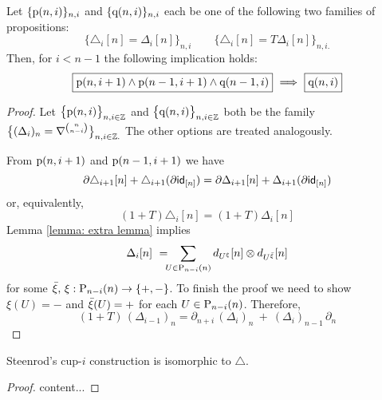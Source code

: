 \newpage


%
%
%
%
%

\begin{lemma}
    Let $\{\p(n, i)\}_{n, i}$ and $\{\q(n, i)\}_{n, i}$ each be one of the following two families of propositions:
    \[ \label{proposition: uniqueness: eq1}
    \big\{ \triangle_i  [n] = \Delta_ i [n] \big\}_{n, i} \qquad
    \big\{ \triangle_i  [n] = T \Delta_ i [n] \big\}_{n, i.}
    \]
    Then, for $i < n-1$ the following implication holds:
    \[ \label{proposition: uniqueness: eq2}
    \boxed{\p(n,i+1) \wedge \p(n-1,i+1) \wedge \q(n-1,i)}\ \Longrightarrow\ \boxed{\q(n,i)}
    \]
\end{lemma}

\begin{proof}
        Let $\big\{ \p(n,i) \big\}_{n,i \in \Z}$ and $\big\{ \q(n,i) \big\}_{n,i \in \Z}$ both be the family $\big\{ (\Delta_i)_n = \nabla^{n \choose n-i} \big\}_{n,i \in \Z.}$ The other options are treated analogously.

		From $\p(n, i+1)$ and $\p(n-1, i+1)$ we have
		\[
		\partial \triangle_{i+1} [n] + \triangle_{i+1} (\partial \id_{[n]}) = \partial \Delta_{i+1} [n] + \Delta_{i+1} (\partial \id_{[n]})
		\]
		or, equivalently,
		\[
		(1+T) \triangle_{i}  [n] = (1+T) \Delta_{i}  [n]
		\]
		Lemma \ref{lemma: extra lemma} implies
		\begin{equation} \label{proposition: uniqueness: induction step: eq1}
		\Delta_{i} [n] \ = \!\!\! \sum_{U \in \P_{n-i}(n)} d_{U^{\xi}} [n] \tensor d_{U^{\barxi}} [n]
		\end{equation}
		for some $\barxi,\, \xi: \P_{n-i}(n)\to\{+,-\}$.
To finish the proof we need to show $\xi(U) = -$ and $\barxi(U) = +$
		for each $U \in \P_{n-i}(n)$.
 Therefore,
		\[
		(1+T)\,(\Delta_{i-1})_n =
		\partial_{n+i}\, (\Delta_{i})_n\ +\ (\Delta_{i})_{n-1}\, \partial_{n}
		\]
\end{proof}

\begin{proposition} \label{proposition: uniqueness}
    Steenrod's cup-$i$ construction is isomorphic to $\triangle$.
\end{proposition}

\begin{proof}
    content...
\end{proof}